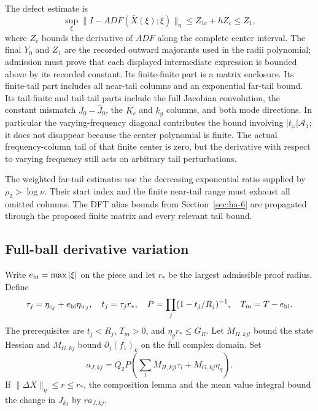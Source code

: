 \documentclass[11pt]{article}
\theoremstyle{definition}
\begin{document}
The defect estimate is
\[
 \sup_{\xi}\|I-ADF(\bar X(\xi);\xi)\|_\eta
        \le Z_{1c}+hZ_c\le Z_1,
\]
where $Z_c$ bounds the derivative of $ADF$ along the complete center interval. The final $Y_0$ and $Z_1$ are the recorded outward majorants used in the radii polynomial; admission must prove that each displayed intermediate expression is bounded above by its recorded constant. Its finite-finite part is a matrix enclosure. Its finite-tail part includes all near-tail columns and an exponential far-tail bound. Its tail-finite and tail-tail parts include the full Jacobian convolution, the constant mismatch $J_0-\widehat J_0$, the $K_c$ and $k_g$ columns, and both mode directions. In particular the varying-frequency diagonal contributes the bound involving $|t_\omega|\mathcal A_1$; it does not disappear because the center polynomial is finite. The actual frequency-column tail of that finite center is zero, but the derivative with respect to varying frequency still acts on arbitrary tail perturbations.

The weighted far-tail estimates use the decreasing exponential ratio supplied by $\rho_2>\log\nu$. Their start index and the finite near-tail range must exhaust all omitted columns. The DFT alias bounds from Section~\ref{sec:ha-6} are propagated through the proposed finite matrix and every relevant tail bound.

\subsection{Full-ball derivative variation}\label{sec:ha-8}

Write $e_{\rm hi}=\max|\xi|$ on the piece and let $r_*$ be the largest admissible proof radius. Define
\[
 \tau_j=\eta_{c_j}+e_{\rm hi}\eta_{w_j},\quad
 t_j=\tau_jr_*,\quad
 P=\prod_j(1-t_j/R_j)^{-1},\quad T_m=T-e_{\rm hi}.
\]
The prerequisites are $t_j<R_j$, $T_m>0$, and $\eta_g r_*\le G_R$. Let $M_{H,kjl}$ bound the state Hessian and $M_{G,kj}$ bound $\partial_j(f_1)_k$ on the full complex domain. Set
\[
 a_{J,kj}=Q_2P\left(\sum_lM_{H,kjl}\tau_l
                                  +M_{G,kj}\eta_g\right).
\]
If $\|\Delta X\|_\eta\le r\le r_*$, the composition lemma and the mean value integral bound the change in $J_{kj}$ by $r a_{J,kj}$.
\end{document}
